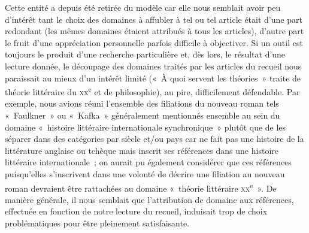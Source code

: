 \documentclass[12pt, a4paper]{article}
\begin{document}
    Cette entité a depuis été retirée du modèle car elle nous semblait avoir peu d'intérêt tant le choix des domaines à affubler à tel ou tel article était d'une part redondant (les mêmes domaines étaient attribués à tous les articles), d'autre part le fruit d'une appréciation personnelle parfois difficile à objectiver. Si un outil est toujours le produit d'une recherche particulière et, dès lors, le résultat d'une lecture donnée, le découpage des domaines traités par les articles du recueil nous paraissait au mieux d'un intérêt limité («~À quoi servent les théories~» traite de théorie littéraire du \textsc{xx}\textsuperscript{e} et de philosophie), au pire, difficilement défendable. Par exemple, nous avions réuni l'ensemble des filiations du nouveau roman tels «~Faulkner~» ou «~Kafka~» généralement mentionnés ensemble au sein du domaine «~histoire littéraire internationale synchronique~» plutôt que de les séparer dans des catégories par siècle et/ou pays car \robbe{} ne fait pas une histoire de la littérature anglaise ou tchèque mais inscrit ses références dans une histoire littéraire internationale~; on aurait pu également considérer que ces références puisqu'elles s'inscrivent dans une volonté de décrire une filiation au nouveau roman devraient être rattachées au domaine «~théorie littéraire \textsc{xx}\textsuperscript{e}~». De manière générale, il nous semblait que l'attribution de domaine aux références, effectuée en fonction de notre lecture du recueil, induisait trop de choix problématiques pour être pleinement satisfaisante.



    
\end{document}
